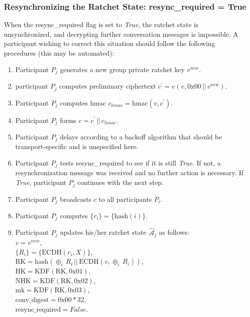 \documentclass[%
preprint,
amsmath,amssymb,
aps,
prb,
floatfix,
]{revtex4-1}
\begin{document}
\subsubsection{\label{sec:sendresync}Resynchronizing the Ratchet State:
resync\_required = True}
When the resync\_required flag is set to \textit{True}, the ratchet state is
unsynchronized, and decrypting further conversation messages is impossible.
A participant wishing to correct this situation should follow the following
procedures (this may be automated):
\begin{enumerate}
\item Participant $P_j$ generates a new group private ratchet key $v^{new}$.
\item participant $P_j$ computes preliminary ciphertext $c^\prime = e(v, 0\mathrm{x}00
\, || \, v^{new})$.
\item Participant $P_j$ computes hmac $c_{hmac} = \mathrm{hmac}(v, c^\prime)$.
\item Participant $P_j$ forms $c = c^\prime \, || \, c_{hmac}$.
\item Participant $P_j$ delays according to a backoff algorithm
that should be transport-specific and is unspecified here.
\item Participant $P_j$ tests resync\_required to see if it is still
\textit{True}. If not, a resynchronization message was received and no further
action is necessary. If \textit{True}, participant $P_j$ continues with the next
step.
\item Participant $P_j$ broadcasts $c$ to all participants $P_i$.
\item Participant $P_j$ computes $\{r_i\} = \{\mathrm{hash}(i)\}$.
\item Participant $P_j$ updates his/her ratchet state
$\mathcal{\hat{A}}_j$ as follows:\\
$v = v^{new}$, \\
$\{R_i\} = \{\mathrm{ECDH}(r_i, X)\}$, \\
$\mathrm{RK} = \mathrm{hash}(\oplus_i \, R_i \, || \, \mathrm{ECDH}(v, \oplus_i
\, R_i))$, \\
$\mathrm{HK} = \mathrm{KDF}(\mathrm{RK}, 0\mathrm{x}01)$, \\
$\mathrm{NHK} = \mathrm{KDF}(\mathrm{RK}, 0\mathrm{x}02)$, \\
$\mathrm{mk} = \mathrm{KDF}(\mathrm{RK}, 0\mathrm{x}03)$, \\
$\mathrm{conv\_digest} = 0\mathrm{x}00 * 32$, \\
$\mathrm{resync\_required} = False$.
\end{enumerate}
\end{document}
